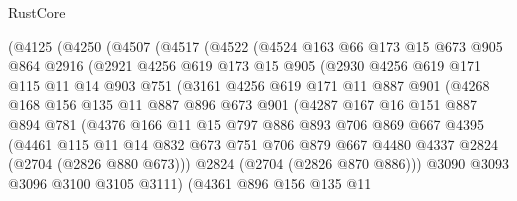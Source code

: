 \begin{lexlean}{RustCore}
\begin{coremodule}
    (@4125
      (@4250
        (@4507
          (@4517
            (@4522
              (@4524
                @163
                @66
                @173
                @15
                @673
                @905
                @864
                @2916
                (@2921
                  @4256
                  @619
                  @173
                  @15
                  @905
                  (@2930
                    @4256
                    @619
                    @171
                    @115
                    @11
                    @14
                    @903
                    @751
                    (@3161
                      @4256
                      @619
                      @171
                      @11
                      @887
                      @901
                      (@4268
                        @168
                        @156
                        @135
                        @11
                        @887
                        @896
                        @673
                        @901
                        (@4287
                          @167
                          @16
                          @151
                          @887
                          @894
                          @781
                          (@4376
                            @166
                            @11
                            @15
                            @797
                            @886
                            @893
                            @706
                            @869
                            @667
                            @4395
                            (@4461
                              @115
                              @11
                              @14
                              @832
                              @673
                              @751
                              @706
                              @879
                              @667
                              @4480
                              @4337
                              @2824
                              (@2704 (@2826 @880 @673)))
                            @2824
                            (@2704 (@2826 @870 @886)))
                          @3090
                          @3093
                          @3096
                          @3100
                          @3105
                          @3111)
                        (@4361
                          @896
                          @156
                          @135
                          @11

\end{coremodule}
\end{lexlean}
